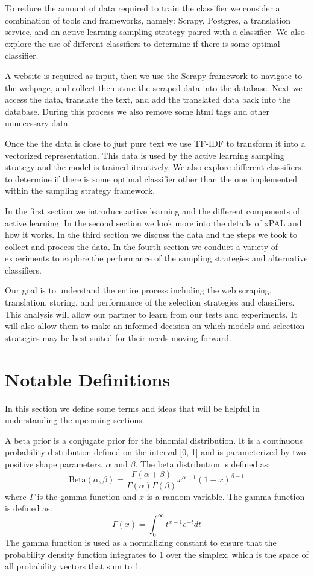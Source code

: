 To reduce the amount of data required to train the classifier we consider a combination of tools and frameworks, namely: Scrapy, Postgres, a translation service, and an active learning sampling strategy paired with a classifier. We also explore the use of different classifiers to determine if there is some optimal classifier.

A website is required as input, then we use the Scrapy framework to navigate to the webpage, and collect then store the scraped data into the database. Next we access the data, translate the text, and add the translated data back into the database. During this process we also remove some html tags and other unnecessary data.

Once the the data is close to just pure text we use TF-IDF to transform it into a vectorized representation. This data is used by the active learning sampling strategy and the model is trained iteratively. We also explore different classifiers to determine if there is some optimal classifier other than the one implemented within the sampling strategy framework.

In the first section we introduce active learning and the different components of active learning. In the second section we look more into the details of xPAL and how it works. In the third section we discuss the data and the steps we took to collect and process the data. In the fourth section we conduct a variety of experiments to explore the performance of the sampling strategies and alternative classifiers. 

Our goal is to understand the entire process including the web scraping, translation, storing, and performance of the selection strategies and classifiers. This analysis will allow our partner to learn from our tests and experiments. It will also allow them to make an informed decision on which models and selection strategies may be best suited for their needs moving forward.

\section*{Notable Definitions}

In this section we define some terms and ideas that will be helpful in understanding the upcoming sections.

\begin{defn}
\label{def:beta_prior}
A beta prior is a conjugate prior for the binomial distribution. It is a continuous probability distribution defined on the interval [0, 1] and is parameterized by two positive shape parameters, \(\alpha\) and \(\beta\). The beta distribution is defined as: 
\[\text{Beta}(\alpha, \beta) = \frac{\Gamma(\alpha + \beta)}{\Gamma(\alpha)\Gamma(\beta)}x^{\alpha - 1}(1 - x)^{\beta - 1}\]
where \(\Gamma\) is the gamma function and \(x\) is a random variable. The gamma function is defined as:
\[\Gamma(x) = \int_0^\infty t^{x - 1}e^{-t}dt\]
The gamma function is used as a normalizing constant to ensure that the probability density function integrates to 1 over the simplex, which is the space of all probability vectors that sum to 1.
\end{defn}


